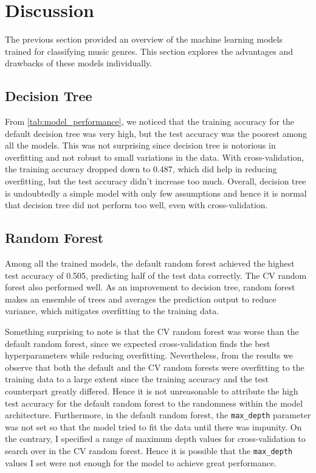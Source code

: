 \documentclass{article}
\begin{document}
\section{Discussion}

The previous section provided an overview of the machine learning models trained for classifying music genres. This section explores the advantages and drawbacks of these models individually.

\subsection{Decision Tree}

From \autoref{tab:model_performance}, we noticed that the training accuracy for the default decision tree was very high, but the test accuracy was the poorest among all the models. This was not surprising since decision tree is notorious in overfitting and not robust to small variations in the data. With cross-validation, the training accuracy dropped down to 0.487, which did help in reducing overfitting, but the test accuracy didn't increase too much. Overall, decision tree is undoubtedly a simple model with only few assumptions and hence it is normal that decision tree did not perform too well, even with cross-validation.

\subsection{Random Forest}

Among all the trained models, the default random forest achieved the highest test accuracy of 0.505, predicting half of the test data correctly. The CV random forest also performed well. As an improvement to decision tree, random forest makes an ensemble of trees and averages the prediction output to reduce variance, which mitigates overfitting to the training data.

Something surprising to note is that the CV random forest was worse than the default random forest, since we expected cross-validation finds the best hyperparameters while reducing overfitting. Nevertheless, from the results we observe that both the default and the CV random forests were overfitting to the training data to a large extent since the training accuracy and the test counterpart greatly differed. Hence it is not unreasonable to attribute the high test accuracy for the default random forest to the randomness within the model architecture. Furthermore, in the default random forest, the \texttt{max\_depth} parameter was not set so that the model tried to fit the data until there was impunity. On the contrary, I specified a range of maximum depth values for cross-validation to search over in the CV random forest. Hence it is possible that the \texttt{max\_depth} values I set were not enough for the model to achieve great performance.
\end{document}
